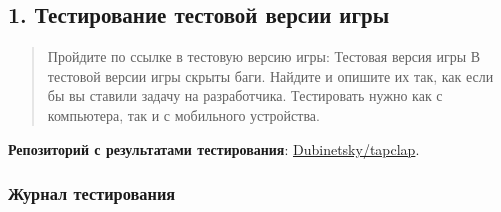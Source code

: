 \documentclass{ZGJournalArticle_2026}
\begin{document}
\titlesection %

\subsection{1. Тестирование тестовой версии
игры}\label{ux442ux435ux441ux442ux438ux440ux43eux432ux430ux43dux438ux435-ux442ux435ux441ux442ux43eux432ux43eux439-ux432ux435ux440ux441ux438ux438-ux438ux433ux440ux44b}

\begin{quote}
Пройдите по ссылке в тестовую версию игры: Тестовая версия игры В
тестовой версии игры скрыты баги. Найдите и опишите их так, как если бы
вы ставили задачу на разработчика. Тестировать нужно как с компьютера,
так и с мобильного устройства.
\end{quote}

\textbf{Репозиторий с результатами тестирования}:
\href{https://github.com/Dubinetsky/tapclap}{Dubinetsky/tapclap}.

\newpage

\subsubsection{Журнал
тестирования}\label{ux436ux443ux440ux43dux430ux43b-ux442ux435ux441ux442ux438ux440ux43eux432ux430ux43dux438ux44f}
\end{document}

